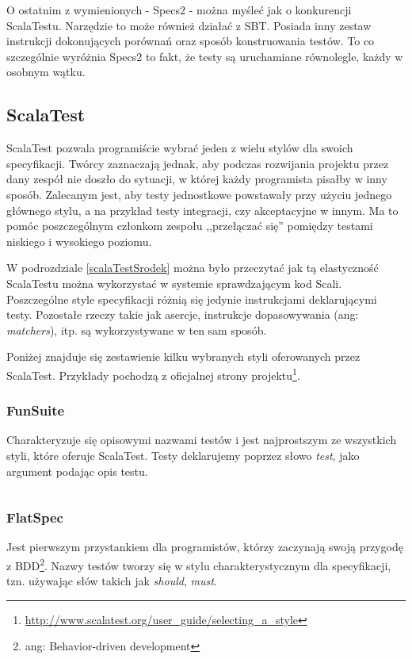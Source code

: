 \documentclass[brudnopis]{xmgr}
\begin{document}
O ostatnim z wymienionych - Specs2 - można myśleć jak o konkurencji ScalaTestu. Narzędzie to może również działać z SBT. Posiada inny zestaw instrukcji dokonujących porównań oraz sposób konstruowania testów. To co szczególnie wyróżnia Specs2 to fakt, że testy są uruchamiane równolegle, każdy w osobnym wątku.
      
\subsection{ScalaTest}

ScalaTest pozwala programiście wybrać jeden z wielu stylów dla swoich specyfikacji. Twórcy zaznaczają jednak, aby podczas rozwijania projektu przez dany zespół nie doszło do sytuacji, w której każdy programista pisałby w inny sposób. Zalecanym jest, aby testy jednostkowe powstawały przy użyciu jednego głównego stylu, a na przykład testy integracji, czy akceptacyjne w innym. Ma to pomóc poszczególnym członkom zespołu ,,przełączać się'' pomiędzy testami niskiego i wysokiego poziomu.

W podrozdziale \ref{scalaTestSrodek} można było przeczytać jak tą elastyczność ScalaTestu można wykorzystać w systemie sprawdzającym kod Scali. Poszczególne style specyfikacji różnią się jedynie instrukcjami deklarującymi testy. Pozostałe rzeczy takie jak asercje, instrukcje dopasowywania (ang: \emph{matchers}), itp. są wykorzystywane w ten sam sposób.

Poniżej znajduje się zestawienie kilku wybranych styli oferowanych przez ScalaTest. Przykłady pochodzą z oficjalnej strony projektu\footnote{\url{http://www.scalatest.org/user_guide/selecting_a_style}}.

\subsubsection{FunSuite}

Charakteryzuje się opisowymi nazwami testów i jest najprostszym ze wszystkich styli, które oferuje ScalaTest. Testy deklarujemy poprzez słowo \emph{test}, jako argument podając opis testu.

\inputminted[fontsize=\small]{scala}{code/FunSuite.scala}
 
\subsubsection{FlatSpec}

Jest pierwszym przystankiem dla programistów, którzy zaczynają swoją przygodę z BDD\footnote{ang: Behavior-driven development}. Nazwy testów tworzy się w stylu charakterystycznym dla specyfikacji, tzn. używając słów takich jak \emph{should}, \emph{must}.
\end{document}
